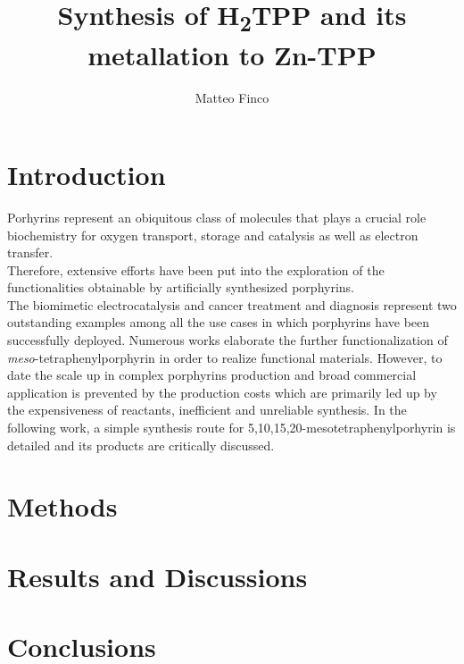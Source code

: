 \documentclass[num-refs]{wiley-article}
\title{Synthesis of \texorpdfstring{H\textsubscript{2}}-TPP and its metallation to Zn-TPP}
\author[1\authfn{1}]{Matteo Finco}
\affil[1]{DiSC, Università degli Studi di Padova, Padova, Italy, 35131, Italy}
\begin{document}
\begin{frontmatter}
\maketitle

\begin{abstract}

\end{abstract}
\end{frontmatter}

\section{Introduction}
Porhyrins represent an obiquitous class of molecules that plays a crucial role biochemistry for oxygen transport\cite{hardison_evolution_2012}, storage\citep{kendrew_three-dimensional_1958} and catalysis as well as electron transfer\citep{keilin_cytochrome_1925}.\\
Therefore, extensive efforts have been put into the exploration of the functionalities obtainable by artificially synthesized porphyrins.\\
The biomimetic electrocatalysis\cite{facchin_oxygen_2021}\cite{liang_porphyrin-based_2021} and cancer treatment and diagnosis\cite{wang_recent_2021} represent two outstanding examples among all the use cases in which porphyrins have been successfully deployed.
Numerous works elaborate the further functionalization of \textit{meso}-tetraphenylporphyrin\cite{silva_porphyrins_2006} in order to realize functional materials.
However, to date the scale up in complex porphyrins production and broad commercial application is prevented by the production costs which are primarily led up by the expensiveness of reactants, inefficient and unreliable synthesis.
In the following work, a simple synthesis route for 5,10,15,20-mesotetraphenylporhyrin is detailed and its products are critically discussed.
\twocolumn
\section{Methods}
\section{Results and Discussions}
\section{Conclusions}
\end{document}
